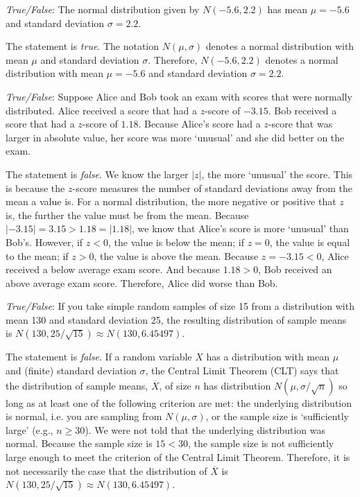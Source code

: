 \documentclass[11pt,letterpaper]{article}
\begin{document}
\newpage





\quizsol \textit{True/False}: The normal distribution given by $N(-5.6, 2.2)$ has mean $\mu= -5.6$ and standard deviation $\sigma= 2.2$. \pspace

\sol The statement is \textit{true}. The notation $N(\mu, \sigma)$ denotes a normal distribution with mean $\mu$ and standard deviation $\sigma$. Therefore, $N(-5.6, 2.2)$ denotes a normal distribution with mean $\mu= -5.6$ and standard deviation $\sigma= 2.2$. \pvspace{1.5cm}



\quizsol \textit{True/False}: Suppose Alice and Bob took an exam with scores that were normally distributed. Alice received a score that had a $z$-score of $-3.15$. Bob received a score that had a $z$-score of $1.18$. Because Alice's score had a $z$-score that was larger in absolute value, her score was more `unusual' and she did better on the exam. \pspace

\sol The statement is \textit{false}. We know the larger $|z|$, the more `unusual' the score. This is because the $z$-score measures the number of standard deviations away from the mean a value is. For a normal distribution, the more negative or positive that $z$ is, the further the value must be from the mean. Because $|-3.15|= 3.15 > 1.18= |1.18|$, we know that Alice's score is more `unusual' than Bob's. However, if $z < 0$, the value is below the mean; if $z= 0$, the value is equal to the mean; if $z > 0$, the value is above the mean. Because $z= -3.15 < 0$, Alice received a below average exam score. And because $1.18 > 0$, Bob received an above average exam score. Therefore, Alice did worse than Bob. \pvspace{1.5cm}



\quizsol \textit{True/False}: If you take simple random samples of size 15 from a distribution with mean 130 and standard deviation 25, the resulting distribution of sample means is $N(130, 25/\sqrt{15}) \approx N(130, 6.45497)$. \pspace

\sol The statement is \textit{false}. If a random variable $X$ has a distribution with mean $\mu$ and (finite) standard deviation $\sigma$, the Central Limit Theorem (CLT) says that the distribution of sample means, $\overline{X}$, of size $n$ has distribution $N(\mu, \sigma/\sqrt{n})$ so long as at least one of the following criterion are met: the underlying distribution is normal, i.e. you are sampling from $N(\mu, \sigma)$, or the sample size is `sufficiently large' (e.g., $n \geq 30$). We were not told that the underlying distribution was normal. Because the sample size is $15 < 30$, the sample size is not sufficiently large enough to meet the criterion of the Central Limit Theorem. Therefore, it is not necessarily the case that the distribution of $\overline{X}$ is $N(130, 25/\sqrt{15}) \approx N(130, 6.45497)$. \pvspace{1.5cm}
\end{document}
